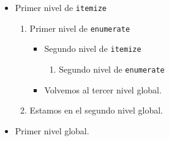 \documentclass[a4paper,12pt]{article}
\begin{document}
 \begin{itemize}
    \item Primer nivel de \texttt{itemize}
        \begin{enumerate}
            \item Primer nivel de \texttt{enumerate}
                \begin{itemize}
                    \item Segundo nivel de \texttt{itemize}
                        \begin{enumerate}
                            \item Segundo nivel de \texttt{enumerate}
                        \end{enumerate}
                    \item Volvemos al tercer nivel global.
                \end{itemize}
            \item Estamos en el segundo nivel global.
        \end{enumerate}
    \item Primer nivel global.
 \end{itemize}

 
\end{document}
